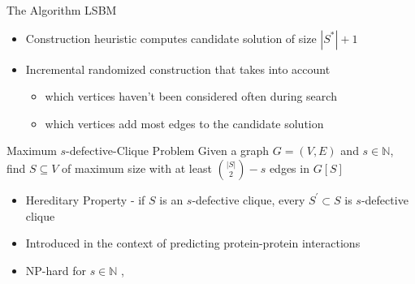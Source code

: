 \documentclass{beamer}
\begin{document}
\begin{frame}{The Algorithm LSBM}
    \begin{itemize}
        \item<1-> Construction heuristic computes candidate solution of size $|S^*|+1$
        \item<2-> Incremental randomized construction that takes into account
        \begin{itemize}
            \item<3-> which vertices haven't been considered often during search
            \item<4-> which vertices add most edges to the candidate solution
        \end{itemize}
    \end{itemize}
     
\end{frame}

\begin{frame}{Maximum $s$-defective-Clique Problem}
    Given a graph $G = (V,E)$ and $s \in \mathbb{N}$, find $S \subseteq V$ of maximum size with at least $\binom{|S|}{2} - s$ edges in $G[S]$
    \begin{itemize}
        \item<1-> Hereditary Property - if $S$ is an $s$-defective clique, every $S^\prime \subset S$ is $s$-defective clique
        \item<2-> Introduced in the context of predicting protein-protein interactions~\cite{Yu2006}
        \item<3-> NP-hard for $s \in \mathbb{N}$ \cite{Yannakakis1978},\cite{Trukhanov2013}
    \end{itemize}
\end{frame}
\end{document}
